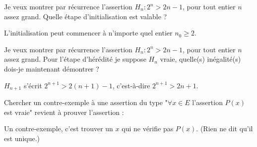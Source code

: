 \begin{question}

\qkeeporder

Je veux montrer par récurrence l'assertion $H_n : 2^n > 2n-1$, pour tout entier $n$ assez grand. Quelle étape d'initialisation est valable ?
\begin{answers}



\end{answers}
\begin{explanations}
L'initialisation peut commencer à n'importe quel entier $n_0 \ge 2$.
\end{explanations}
\end{question}


\begin{question}

Je veux montrer par récurrence l'assertion $H_n : 2^n > 2n-1$, pour tout entier $n$ assez grand. Pour l'étape d'hérédité je suppose $H_n$ vraie, quelle(s) inégalité(s) dois-je maintenant démontrer ?
\begin{answers}
    


\end{answers}
\begin{explanations}
$H_{n+1}$ s'écrit $2^{n+1} > 2(n+1)-1$, c'est-à-dire $2^{n+1} > 2n+1$.
\end{explanations}
\end{question}


\begin{question}

Chercher un contre-exemple à une assertion du type 
"$\forall x \in E$ l'assertion $P(x)$ est vraie" revient à prouver l'assertion :
\begin{answers}

    
    
\end{answers}
\begin{explanations}
Un contre-exemple, c'est trouver un $x$ qui ne vérifie pas $P(x)$. (Rien ne dit qu'il est unique.)
\end{explanations}
\end{question}



